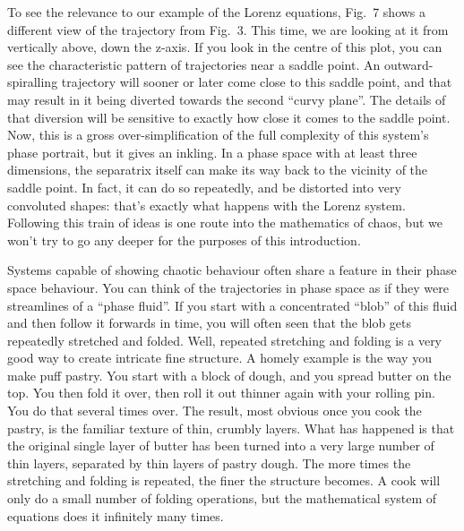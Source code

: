 
  To see the relevance to our example of the Lorenz equations, Fig.\ 7 shows a 
  different view of the trajectory from Fig.\ 3. This time, we are looking at 
  it from vertically above, down the z-axis. If you look in the centre of this 
  plot, you can see the characteristic pattern of trajectories near a saddle 
  point. An outward-spiralling trajectory will sooner or later come close to 
  this saddle point, and that may result in it being diverted towards the 
  second ``curvy plane''. The details of that diversion will be sensitive to 
  exactly how close it comes to the saddle point. Now, this is a gross 
  over-simplification of the full complexity of this system's phase portrait, 
  but it gives an inkling. In a phase space with at least three dimensions, the 
  separatrix itself can make its way back to the vicinity of the saddle point. 
  In fact, it can do so repeatedly, and be distorted into very convoluted 
  shapes: that's exactly what happens with the Lorenz system. Following this 
  train of ideas is one route into the mathematics of chaos, but we won't try 
  to go any deeper for the purposes of this introduction. 


  Systems capable of showing chaotic behaviour often share a feature in their 
  phase space behaviour. You can think of the trajectories in phase space as if 
  they were streamlines of a “phase fluid”. If you start with a concentrated 
  “blob” of this fluid and then follow it forwards in time, you will often seen 
  that the blob gets repeatedly stretched and folded. Well, repeated stretching 
  and folding is a very good way to create intricate fine structure. A homely 
  example is the way you make puff pastry. You start with a block of dough, and 
  you spread butter on the top. You then fold it over, then roll it out thinner 
  again with your rolling pin. You do that several times over. The result, most 
  obvious once you cook the pastry, is the familiar texture of thin, crumbly 
  layers. What has happened is that the original single layer of butter has 
  been turned into a very large number of thin layers, separated by thin layers 
  of pastry dough. The more times the stretching and folding is repeated, the 
  finer the structure becomes. A cook will only do a small number of folding 
  operations, but the mathematical system of equations does it infinitely many 
  times. 


